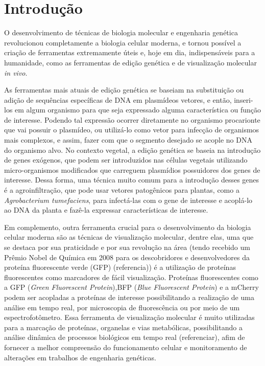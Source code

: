 \section{Introdução} 
O desenvolvimento de técnicas de biologia molecular e engenharia genética
revolucionou completamente a biologia celular moderna, e tornou possível a
criação de ferramentas extremamente úteis e, hoje em dia, indispensáveis para a
humanidade, como as ferramentas de edição genética e de visualização molecular
\textit{in vivo}.

As ferramentas mais atuais de edição genética se baseiam na substituição ou
adição de sequências específicas de DNA em plasmídeos vetores, e então,
inseri-los em algum organismo para que seja expressado alguma característica ou
função de interesse. Podendo tal expressão ocorrer diretamente no organismo
procarionte que vai possuir o plasmídeo, ou utilizá-lo como vetor para infecção
de organismos mais complexos, e assim, fazer com que o segmento desejado se
acople no DNA do organismo alvo. No contexto vegetal, a edição genética se
baseia na introdução de genes exógenos, que podem ser introduzidos nas células
vegetais utilizando micro-organismos modificados que carreguem plasmídios
possuidores dos genes de interesse. Dessa forma, uma técnica muito comum para a
introdução desses genes é a agroinfiltração, que pode usar vetores patogênicos
para plantas, como a \textit{Agrobacterium tumefaciens}, para infectá-las com o
gene de interesse e acoplá-lo ao DNA da planta e fazê-la expressar
características de interesse.

Em complemento, outra ferramenta crucial para o desenvolvimento da biologia
celular moderna são as técnicas de visualização molecular, dentre elas, uma que
se destaca por sua praticidade e por sua revolução na área (tendo recebido um
Prêmio Nobel de Química em 2008 para os descobridores e desenvolvedores da
proteína fluorescente verde (GFP) (referencia)) é a utilização de proteínas
fluorescentes como marcadores de fácil visualização. Proteínas fluorescentes
como a GFP (\textit{Green Fluorescent Protein}),BFP (\textit{Blue Fluorescent
Protein}) e a mCherry podem ser acopladas a proteínas de interesse
possibilitando a realização de uma análise em tempo real, por microscopia de
fluorescência ou por meio de um espectrofotômetro.  Essa ferramenta de
visualização molecular é muito utilizadas para a marcação de proteínas,
organelas e vias metabólicas, possibilitando a análise dinâmica de processos
biológicos em tempo real (referenciar), afim de fornecer a melhor compreensão do
funcionamento celular e monitoramento de alterações em trabalhos de engenharia
genéticas. 

